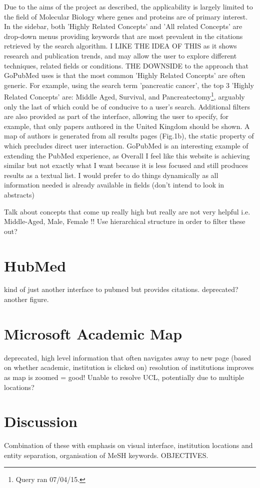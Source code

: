 \documentclass[PROP_AGutteridge_CS.tex]{subfiles}
\begin{document}
\noindent Due to the aims of the project as described\cite{doms}, the applicability is largely limited to the field of Molecular Biology where genes and proteins are of primary interest. In the sidebar, both 'Highly Related Concepts' and 'All related Concepts' are drop-down menus providing keywords that are most prevalent in the citations retrieved by the search algorithm. I LIKE THE IDEA OF THIS as it shows research and publication trends, and may allow the user to explore different techniques, related fields or conditions. THE DOWNSIDE to the approach that GoPubMed uses is that the most common 'Highly Related Concepts' are often generic. For example, using the search term 'pancreatic cancer', the top 3 'Highly Related Concepts' are: Middle Aged, Survival, and Pancreatectomy\footnote{Query ran 07/04/15.}, arguably only the last of which could be of conducive to a user's search. Additional filters are also provided as part of the interface, allowing the user to specify, for example, that only papers authored in the United Kingdom should be shown. A map of authors is generated from all results pages (Fig.1b), the static property of which precludes direct user interaction. GoPubMed is an interesting example of extending the PubMed experience, as  Overall I feel like this website is achieving similar but not exactly what I want because it is less focused and still produces results as a textual list. I would prefer to do things dynamically as all information needed is already available in fields (don't intend to look in abstracts)

Talk about concepts that come up really high but really are not very helpful i.e. Middle-Aged, Male, Female !! Use hierarchical structure in order to filter these out?

\section{HubMed}
kind of just another interface to pubmed but provides citations. deprecated? another figure.

\section{Microsoft Academic Map}
deprecated, high level information that often navigates away to new page (based on whether academic, institution is clicked on) resolution of institutions improves as map is zoomed = good! Unable to resolve UCL, potentially due to multiple locations?

\section{Discussion}
Combination of these with emphasis on visual interface, institution locations and entity separation, organisation of MeSH keywords. OBJECTIVES.
\end{document}
